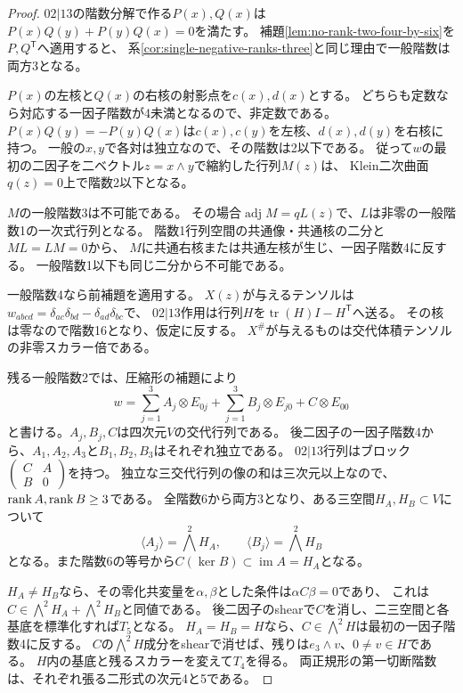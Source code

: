 \begin{proof}
$02|13$の階数分解で作る$P(x),Q(x)$は
$P(x)Q(y)+P(y)Q(x)=0$を満たす。
補題\ref{lem:no-rank-two-four-by-six}を$P,Q^{\mathsf T}$へ適用すると、
系\ref{cor:single-negative-ranks-three}と同じ理由で一般階数は両方3となる。

$P(x)$の左核と$Q(x)$の右核の射影点を$c(x),d(x)$とする。
どちらも定数なら対応する一因子階数が4未満となるので、非定数である。
$P(x)Q(y)=-P(y)Q(x)$は$c(x),c(y)$を左核、$d(x),d(y)$を右核に持つ。
一般の$x,y$で各対は独立なので、その階数は2以下である。
従って$w$の最初の二因子を二ベクトル$z=x\wedge y$で縮約した行列$M(z)$は、
Klein二次曲面$q(z)=0$上で階数2以下となる。

$M$の一般階数3は不可能である。
その場合$\operatorname{adj}M=q L(z)$で、$L$は非零の一般階数1の一次式行列となる。
階数1行列空間の共通像・共通核の二分と$ML=LM=0$から、
$M$に共通右核または共通左核が生じ、一因子階数4に反する。
一般階数1以下も同じ二分から不可能である。

一般階数4なら前補題を適用する。
$X(z)$が与えるテンソルは$w_{abcd}=\delta_{ac}\delta_{bd}-\delta_{ad}\delta_{bc}$で、
$02|13$作用は行列$H$を$\operatorname{tr}(H)I-H^{\mathsf T}$へ送る。
その核は零なので階数16となり、仮定に反する。
$X^\#$が与えるものは交代体積テンソルの非零スカラー倍である。

残る一般階数2では、圧縮形の補題により
\[
 w=\sum_{j=1}^3 A_j\otimes E_{0j}+\sum_{j=1}^3 B_j\otimes E_{j0}+C\otimes E_{00}
\]
と書ける。$A_j,B_j,C$は四次元$V$の交代行列である。
後二因子の一因子階数4から、$A_1,A_2,A_3$と$B_1,B_2,B_3$はそれぞれ独立である。
$02|13$行列はブロック$\left(\begin{smallmatrix}C&A\\B&0\end{smallmatrix}\right)$を持つ。
独立な三交代行列の像の和は三次元以上なので、$\operatorname{rank} A,\operatorname{rank} B\geq3$である。
全階数6から両方3となり、ある三空間$H_A,H_B\subset V$について
\[
 \langle A_j\rangle=\bigwedge^2H_A,\qquad
 \langle B_j\rangle=\bigwedge^2H_B
\]
となる。また階数6の等号から$C(\ker B)\subset\operatorname{im}A=H_A$となる。

$H_A\ne H_B$なら、その零化共変量を$\alpha,\beta$とした条件は$\alpha C\beta=0$であり、
これは$C\in\bigwedge^2H_A+\bigwedge^2H_B$と同値である。
後二因子のshearで$C$を消し、二三空間と各基底を標準化すれば$T_5$となる。
$H_A=H_B=H$なら、$C\in\bigwedge^2H$は最初の一因子階数4に反する。
$C$の$\bigwedge^2H$成分をshearで消せば、残りは$e_3\wedge v$、$0\ne v\in H$である。
$H$内の基底と残るスカラーを変えて$T_4$を得る。
両正規形の第一切断階数は、それぞれ張る二形式の次元4と5である。
\end{proof}

